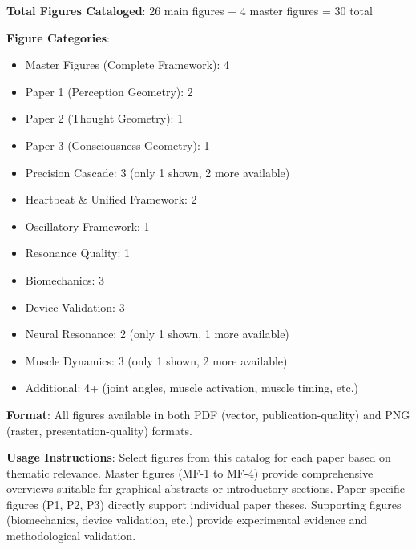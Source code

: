 \documentclass[11pt]{article}
\begin{document}
\textbf{Total Figures Cataloged}: 26 main figures + 4 master figures = 30 total

\textbf{Figure Categories}:
\begin{itemize}
\item Master Figures (Complete Framework): 4
\item Paper 1 (Perception Geometry): 2
\item Paper 2 (Thought Geometry): 1
\item Paper 3 (Consciousness Geometry): 1
\item Precision Cascade: 3 (only 1 shown, 2 more available)
\item Heartbeat \& Unified Framework: 2
\item Oscillatory Framework: 1
\item Resonance Quality: 1
\item Biomechanics: 3
\item Device Validation: 3
\item Neural Resonance: 2 (only 1 shown, 1 more available)
\item Muscle Dynamics: 3 (only 1 shown, 2 more available)
\item Additional: 4+ (joint angles, muscle activation, muscle timing, etc.)
\end{itemize}

\textbf{Format}: All figures available in both PDF (vector, publication-quality) and PNG (raster, presentation-quality) formats.

\textbf{Usage Instructions}: Select figures from this catalog for each paper based on thematic relevance. Master figures (MF-1 to MF-4) provide comprehensive overviews suitable for graphical abstracts or introductory sections. Paper-specific figures (P1, P2, P3) directly support individual paper theses. Supporting figures (biomechanics, device validation, etc.) provide experimental evidence and methodological validation.
\end{document}
